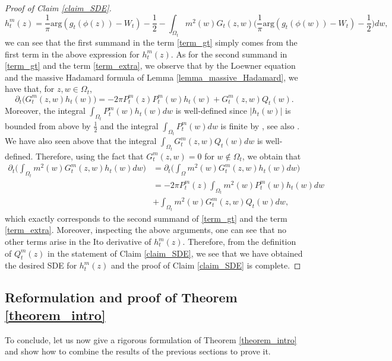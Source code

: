 \documentclass{article}
\theoremstyle{definition}
\theoremstyle{remark}
\theoremstyle{remark}
\begin{document}
\begin{proof}[Proof of Claim \ref{claim_SDE}]
\begin{equation*}
    h_t^m(z) = \frac{1}{\pi}\text{arg}(g_t(\phi(z))-W_t) -\frac{1}{2} - \int_{\Omega_t} m^2(w)G_t(z,w) \bigg( \frac{1}{\pi}\text{arg}(g_t(\phi(w))-W_t) -\frac{1}{2} \bigg) dw,
\end{equation*}
we can see that the first summand in the term \eqref{term_gt} simply comes from the first term in the above expression for $h_t^m(z)$.  As for the second summand in \eqref{term_gt} and the term \eqref{term_extra}, we observe that by the Loewner equation and the massive Hadamard formula of Lemma \ref{lemma_massive_Hadamard}, we have that, for $z,w \in \Omega_t$,
\begin{equation*}
    \partial_t \big( G_t^{m}(z,w)h_t(w)\big) = -2\pi P_t^m(z)P_t^m(w)h_t(w) + G_t^m(z,w)Q_t(w).
\end{equation*}
Moreover, the integral $\int_{\Omega_t}P_t^m(w)h_t(w)dw$ is well-defined since $ \vert h_t(w) \vert$ is bounded from above by $\frac{1}{2}$ and the integral $\int_{\Omega_t}P_t^m(w)dw$ is finite by \cite[Corollary~4.6(i)]{mLERW}, see also \cite[Remark~4.3]{mLERW}. We have also seen above that the integral $\int_{\Omega_t} G_t^m(z,w)Q_t(w) dw$ is well-defined. Therefore, using the fact that $G_t^{m}(z,w)=0$ for $w \notin \Omega_t$, we obtain that
\begin{align*}
    \partial_t \bigg( \int_{\Omega_t} m^{2}(w) G_t^{m}(z,w)h_t(w) dw \bigg) &= \partial_t \bigg( \int_{\Omega} m^2(w) G_t^{m}(z,w)h_t(w) dw \bigg)\\
    &= -2\pi P_t^m(z) \int_{\Omega_t} m^2(w) P_t^m(w)h_t(w) dw  \\
    &+ \int_{\Omega_t} m^2(w)G_t^m(z,w)Q_t(w)dw,
\end{align*}
which exactly corresponds to the second summand of \eqref{term_gt} and the term \eqref{term_extra}. Moreover, inspecting the above arguments, one can see that no other terms arise in the Ito derivative of $h_t^m(z)$. Therefore, from the definition of $Q_t^m(z)$ in the statement of Claim \ref{claim_SDE}, we see that we have obtained the desired SDE for $h_t^m(z)$ and the proof of Claim \ref{claim_SDE} is complete.
\end{proof}

\subsection{Reformulation and proof of Theorem \ref{theorem_intro}} \label{subsec_ccl}

To conclude, let us now give a rigorous formulation of Theorem \ref{theorem_intro} and show how to combine the results of the previous sections to prove it.
\end{document}
